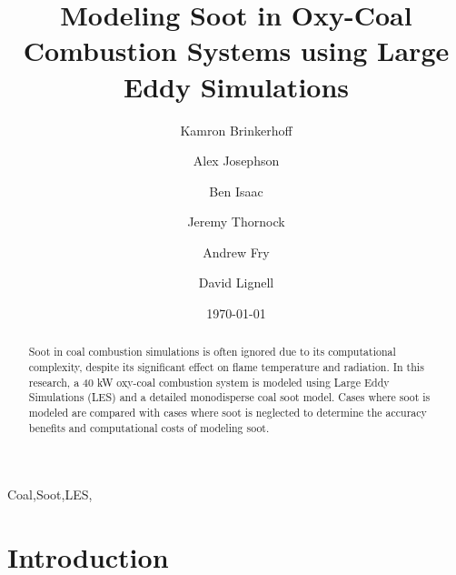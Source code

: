 \documentclass[review,3p]{elsarticle}
\begin{document}


\title{Modeling Soot in Oxy-Coal Combustion Systems using Large Eddy Simulations}

\author[byu]{Kamron Brinkerhoff}
\author[lanl]{Alex Josephson}
\author[llnl]{Ben Isaac}
\author[uofu]{Jeremy Thornock}
\author[byu]{Andrew Fry}
\author[byu,*]{David Lignell}

\address[byu]{350 CB, Brigham Young University, Provo, UT 84602, USA}
\address[lanl]{350 CB, Brigham Young University, Provo, UT 84602, USA}
\address[llnl]{350 CB, Brigham Young University, Provo, UT 84602, USA}
\address[uofu]{350 CB, Brigham Young University, Provo, UT 84602, USA}


\date{\today}


\begin{abstract} %
    Soot in coal combustion simulations is often ignored due to its computational complexity, despite its significant effect on flame temperature and radiation.  In this research, a 40 kW oxy-coal combustion system is modeled using Large Eddy Simulations (LES) and a detailed monodisperse coal soot model. Cases where soot is modeled are compared with cases where soot is neglected to determine the accuracy benefits and computational costs of modeling soot.


\end{abstract}

\begin{keyword}
    Coal\sep Soot\sep LES\sep 
\end{keyword}

\maketitle     

\linenumbers

\section{Introduction}

\end{document}
